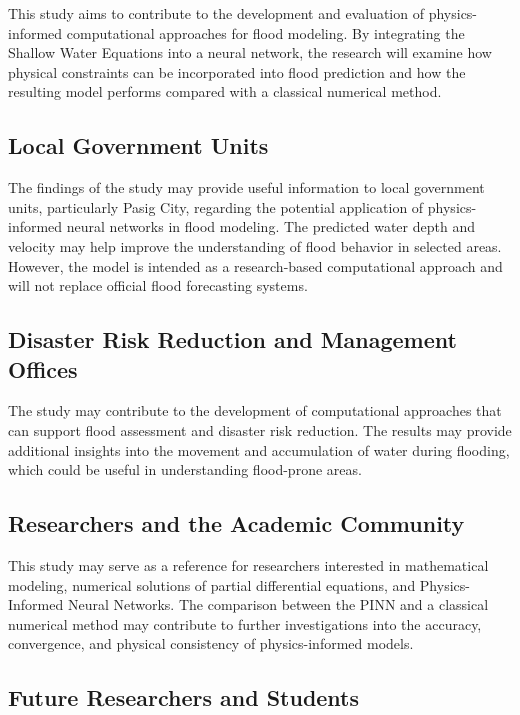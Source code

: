 This study aims to contribute to the development and evaluation of physics-informed computational approaches for flood modeling. By integrating the Shallow Water Equations into a neural network, the research will examine how physical constraints can be incorporated into flood prediction and how the resulting model performs compared with a classical numerical method.

\subsection{Local Government Units}

The findings of the study may provide useful information to local government units, particularly Pasig City, regarding the potential application of physics-informed neural networks in flood modeling. The predicted water depth and velocity may help improve the understanding of flood behavior in selected areas. However, the model is intended as a research-based computational approach and will not replace official flood forecasting systems.

\subsection{Disaster Risk Reduction and Management Offices}

The study may contribute to the development of computational approaches that can support flood assessment and disaster risk reduction. The results may provide additional insights into the movement and accumulation of water during flooding, which could be useful in understanding flood-prone areas.

\subsection{Researchers and the Academic Community}

This study may serve as a reference for researchers interested in mathematical modeling, numerical solutions of partial differential equations, and Physics-Informed Neural Networks. The comparison between the PINN and a classical numerical method may contribute to further investigations into the accuracy, convergence, and physical consistency of physics-informed models.

\subsection{Future Researchers and Students}

